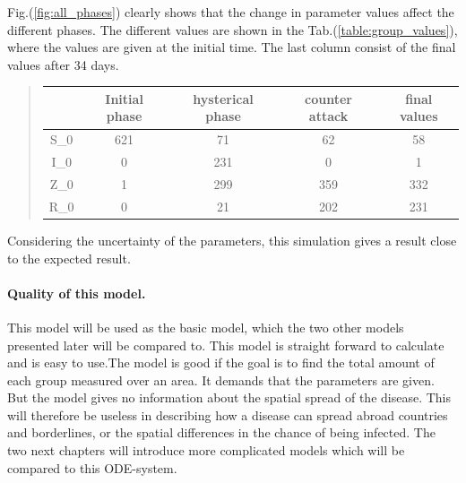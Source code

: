 \documentclass[%
twoside,                 %
final,                   %
10pt]{article}
\begin{document}
Fig.(\ref{fig:all_phases}) clearly shows that the change in parameter values affect the different phases. The different values are shown in the Tab.(\ref{table:group_values}), where the values are given at the initial time. The last column consist of the final values after 34 days.

\label{table:group_values}

\begin{quote}
\begin{tabular}{ccccc}
\hline
\multicolumn{1}{c}{  } & \multicolumn{1}{c}{ Initial phase } & \multicolumn{1}{c}{ hysterical phase } & \multicolumn{1}{c}{ counter attack } & \multicolumn{1}{c}{ final values } \\
\hline
S_0 & 621           & 71               & 62             & 58           \\
I_0 & 0             & 231              & 0              & 1            \\
Z_0 & 1             & 299              & 359            & 332          \\
R_0 & 0             & 21               & 202            & 231          \\
\hline
\end{tabular}
\end{quote}

\noindent
Considering the uncertainty of the parameters, this simulation gives a result close to the expected result. 


\vspace{3mm}




\vspace{3mm}


\paragraph{Quality of this model.}
This model will be used as the basic model, which the two other models presented later will be compared to. This model is straight forward to calculate and is easy to use.The model is good if the goal is to find the total amount of each group measured over an area. It demands that the parameters are given. But the model gives no information about the spatial spread of the disease. This will therefore be useless in describing how a disease can spread abroad countries and borderlines, or the spatial differences in the chance of being infected. The two next chapters will introduce more complicated models which will be compared to this ODE-system. 








\printindex
\end{document}
